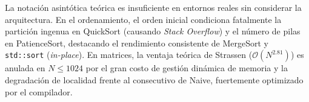 La notación asintótica teórica es insuficiente en entornos reales sin considerar la arquitectura. 
En el ordenamiento, el orden inicial condiciona fatalmente la partición ingenua en QuickSort (causando \textit{Stack Overflow}) 
y el número de pilas en PatienceSort, destacando el rendimiento consistente de MergeSort y \texttt{std::sort} (\textit{in-place}). En matrices, la 
ventaja teórica de Strassen ($\mathcal{O}(N^{2.81})$) es anulada en $N \le 1024$ por el gran costo de gestión dinámica de memoria y 
la degradación de localidad frente al consecutivo de Naive, fuertemente optimizado por el compilador.